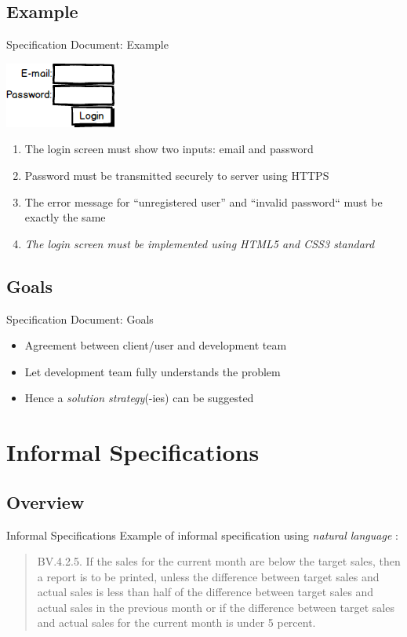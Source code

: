 \documentclass{beamer}
\begin{document}
	\subsection{Example}
	\begin{frame}{Specification Document: Example}
		\begin{center}
			\includegraphics[scale=0.5]{img/01_login}
		\end{center}
		\begin{enumerate}
			\item The login screen must show two inputs: email and password
			\item Password must be transmitted securely to server using HTTPS
			\item The error message for ``unregistered user'' and ``invalid password`` must be exactly the same
			\item \textit{The login screen must be implemented using HTML5 and CSS3 standard} %
		\end{enumerate}
	\end{frame}
	\subsection{Goals}
	\begin{frame}{Specification Document: Goals}
		\begin{itemize}
			\item Agreement between client/user and development team
			\item Let development team fully understands the problem
			\item Hence a \textit{solution strategy}(-ies) can be suggested
		\end{itemize}
	\end{frame}

	\section{Informal Specifications}
	\subsection{Overview}
	\begin{frame}{Informal Specifications}
		Example of informal specification using \textit{natural language} \cite[page 462]{Schach:2006:OCS:1207045}:
		\begin{quotation}
		BV.4.2.5. If the sales for the current month are below the target sales, then a report is to be printed, unless the difference between target sales and actual sales is less than half of the difference between target sales and actual sales in the previous month or if the difference between target sales and actual sales for the current month is under 5 percent.
	\end{quotation}
	\end{frame}
\end{document}
